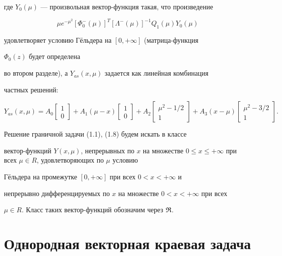 где $Y_0(\mu)$ --- произвольная вектор-функция такая, что произведение 


$$ 


\mu e^{-\mu^2}[\Phi^-_0(\mu)]^T[\Lambda^-(\mu)]^{-1} 


Q_1(\mu)Y_0(\mu) 


$$ 


удовлетворяет условию Г\"ельдера на $[0,+\infty]$ (матрица-функция 


$\Phi_0(z)$ будет определена 


во втором разделе), а $Y_{as}(x,\mu)$ задается как линейная комбинация 


частных решений: 


\begin{equation} 


Y_{as}(x,\mu)=A_0\begin{bmatrix} 1\\ 0 \end{bmatrix}+A_1(\mu-x) 


\begin{bmatrix} 1 \\ 0 \end{bmatrix}+A_2 


\begin{bmatrix} \mu^2-1/2 \\ 1 \end{bmatrix} +A_3(x-\mu) 


\begin{bmatrix} \mu^2-3/2 \\ 1 \end{bmatrix}. 


\end{equation} 


Решение граничной задачи (1.1), (1.8) будем искать в классе 


вектор-функций $Y(x,\mu)$, непрерывных по $x$ на множестве $0\le 


x\le+\infty$ при всех $\mu\in R$, удовлетворяющих по $\mu$ условию 


Г\"ельдера на промежутке $[0,+\infty]$ при всех $0<x<+\infty$ и 


непрерывно дифференцируемых по $x$ на множестве $0<x<+\infty$ при всех 


$\mu\in R$. Класс таких вектор-функций обозначим через $\frak R$. 


 


 


\section{Однородная векторная краевая задача} 


